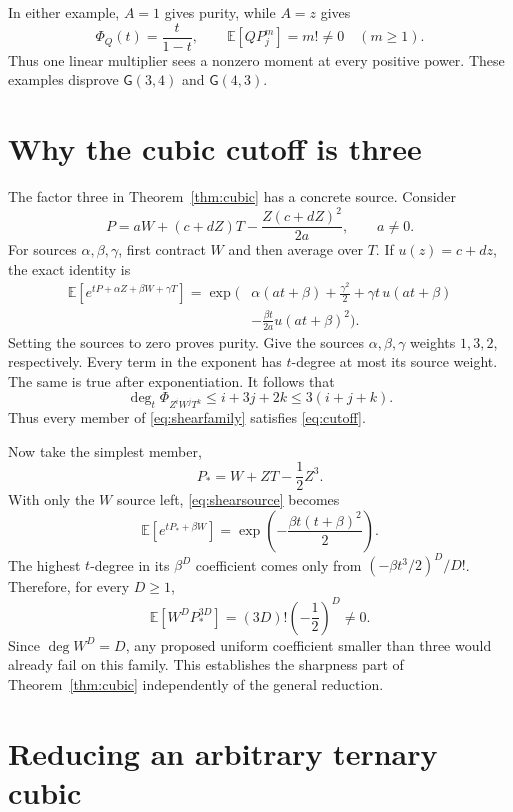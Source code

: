 \documentclass[11pt]{article}
\theoremstyle{definition}\newtheorem{definition}[theorem]{Definition}
\theoremstyle{remark}\newtheorem{remark}[theorem]{Remark}
\newcommand{\E}{\mathbb E}
\newcommand{\G}{\mathsf G}
\begin{document}
In either example, $A=1$ gives purity, while $A=z$ gives
\[
 \Phi_Q(t)=\frac{t}{1-t},\qquad
 \E[QP_j^m]=m!\ne0\quad(m\geq1).
\]
Thus one linear multiplier sees a nonzero moment at every positive
power. These examples disprove $\G(3,4)$ and $\G(4,3)$.

\section{Why the cubic cutoff is three}\label{sec:shear}

The factor three in Theorem~\ref{thm:cubic} has a concrete source.
Consider
\begin{equation}\label{eq:shearfamily}
 P=aW+(c+dZ)T-\frac{Z(c+dZ)^2}{2a},\qquad a\ne0.
\end{equation}
For sources $\alpha,\beta,\gamma$, first contract $W$ and then
average over $T$. If $u(z)=c+dz$, the exact identity is
\begin{equation}\label{eq:shearsource}
\begin{split}
 \E[e^{tP+\alpha Z+\beta W+\gamma T}]
  =\exp\biggl(&\alpha(at+\beta)+\frac{\gamma^2}{2}
       +\gamma t\,u(at+\beta)\\[-2pt]
       &-\frac{\beta t}{2a}u(at+\beta)^2\biggr).
\end{split}
\end{equation}
Setting the sources to zero proves purity. Give the sources
$\alpha,\beta,\gamma$ weights $1,3,2$, respectively. Every term in
the exponent has $t$-degree at most its source weight. The same is true
after exponentiation. It follows that
\[
 \deg_t\Phi_{Z^iW^jT^k}\leq i+3j+2k\leq3(i+j+k).
\]
Thus every member of \eqref{eq:shearfamily} satisfies
\eqref{eq:cutoff}.

Now take the simplest member,
\[
 P_*=W+ZT-\frac12 Z^3.
\]
With only the $W$ source left, \eqref{eq:shearsource} becomes
\[
 \E[e^{tP_*+\beta W}]
   =\exp\!\left(-\frac{\beta t(t+\beta)^2}{2}\right).
\]
The highest $t$-degree in its $\beta^D$ coefficient comes only from
$(-\beta t^3/2)^D/D!$. Therefore, for every $D\geq1$,
\begin{equation}\label{eq:sharp}
 \E[W^D P_*^{3D}]=(3D)!\left(-\frac12\right)^D\ne0.
\end{equation}
Since $\deg W^D=D$, any proposed uniform coefficient smaller than
three would already fail on this family. This establishes the sharpness
part of Theorem~\ref{thm:cubic} independently of the general reduction.

\section{Reducing an arbitrary ternary cubic}\label{sec:cubic}
\end{document}
